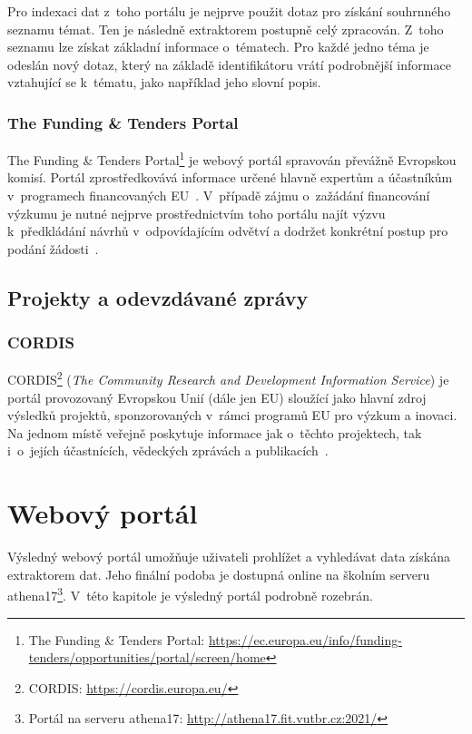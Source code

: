 Pro indexaci dat z~toho portálu je nejprve použit dotaz pro získání souhrnného seznamu témat. Ten je následně extraktorem postupně celý zpracován. Z~toho seznamu lze získat základní informace o~tématech. Pro každé jedno téma je odeslán nový dotaz, který na základě identifikátoru vrátí podrobnější informace vztahující se k~tématu, jako například jeho slovní popis.

\subsubsection*{The Funding \& Tenders Portal}\label{section:funding}

The Funding \& Tenders Portal\footnote{The Funding \& Tenders Portal: \url{https://ec.europa.eu/info/funding-tenders/opportunities/portal/screen/home}} je webový portál spravován převážně Evropskou komisí. Portál zprostředkovává informace určené hlavně expertům a účastníkům v~programech financovaných EU~\cite{bib:funding-about}.
V~případě zájmu o~zažádání financování výzkumu je nutné nejprve prostřednictvím toho portálu najít výzvu k~předkládání návrhů v~odpovídajícím odvětví a dodržet konkrétní postup pro podání žádosti~\cite{bib:funding-find}.

\subsection{Projekty a odevzdávané zprávy}
\blindtext

\subsubsection*{CORDIS}
CORDIS\footnote{CORDIS: \url{https://cordis.europa.eu/}} (\emph{The Community Research and Development Information Service}) je portál provozovaný Evropskou Unií (dále jen EU) sloužící jako hlavní zdroj výsledků projektů, sponzorovaných v~rámci programů EU pro výzkum a inovaci. Na jednom místě veřejně poskytuje informace jak o~těchto projektech, tak i~o~jejích účastnících, vědeckých zprávách a publikacích~\cite{bib:cordis}.



\section{Webový portál}
Výsledný webový portál umožňuje uživateli prohlížet a vyhledávat data získána extraktorem dat. Jeho finální podoba je dostupná online na školním serveru athena17\footnote{Portál na serveru athena17: \url{http://athena17.fit.vutbr.cz:2021/}}. V~této kapitole je výsledný portál podrobně rozebrán.

